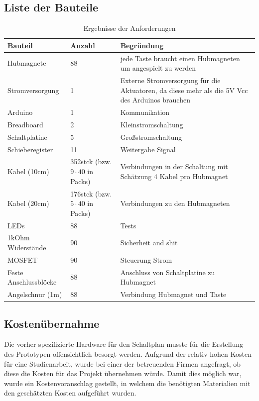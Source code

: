 \subsection{Liste der Bauteile}
\begin{table}[htbp]
    \centering
    \begin{tabular}{|m{3.8cm}|m{1.7cm}|m{8cm}|}
        \hline
        \textbf{Bauteil} &  \textbf{Anzahl} & \textbf{Begründung}  \\
        \hline
        Hubmagnete & 88 & jede Taste braucht einen Hubmagneten um angespielt zu werden \\ %
        \hline
        Stromversorgung & 1 & Externe Stromversorgung für die Aktuatoren, da diese mehr als die 5V Vcc des Arduinos brauchen \\
        \hline
        Arduino & 1 & Kommunikation \\
        \hline
        Breadboard & 2 & Kleinstromschaltung \\
        \hline
        Schaltplatine & 5 & Großstromschaltung\\ %
        \hline
        Schieberegister & 11 & Weitergabe Signal\\
        \hline
        Kabel (10cm) & 352stck (bzw. $9\cdot40$ in Packs) & Verbindungen in der Schaltung mit Schätzung 4 Kabel pro Hubmagnet\\
        \hline
        Kabel (20cm) & 176stck (bzw.$5\cdot40$ in Packs) & Verbindungen zu den Hubmagneten \\
        \hline
        LEDs & 88 & Tests \\
        \hline
        1kOhm Widerstände & 90 & Sicherheit and shit \\
        \hline
        MOSFET & 90 & Steuerung Strom \\
        \hline
        Feste Anschlussblöcke & 88 & Anschluss von Schaltplatine zu Hubmagnet\\
        \hline
        Angelschnur (1m) & 88 & Verbindung Hubmagnet und Taste \\
        \hline
    \end{tabular}
    \caption{Ergebnisse der Anforderungen}
    \label{table:Bauteile}
\end{table}

\subsection{Kostenübernahme}
Die vorher spezifizierte Hardware für den Schaltplan musste für die Erstellung des Prototypen offensichtlich besorgt werden.
Aufgrund der relativ hohen Kosten für eine Studienarbeit, wurde bei einer der betreuenden Firmen angefragt, ob diese die Kosten für das Projekt übernehmen würde.
Damit dies möglich war, wurde ein Kostenvoranschlag gestellt, in welchem die benötigten Materialien mit den geschätzten Kosten aufgeführt wurden. %

